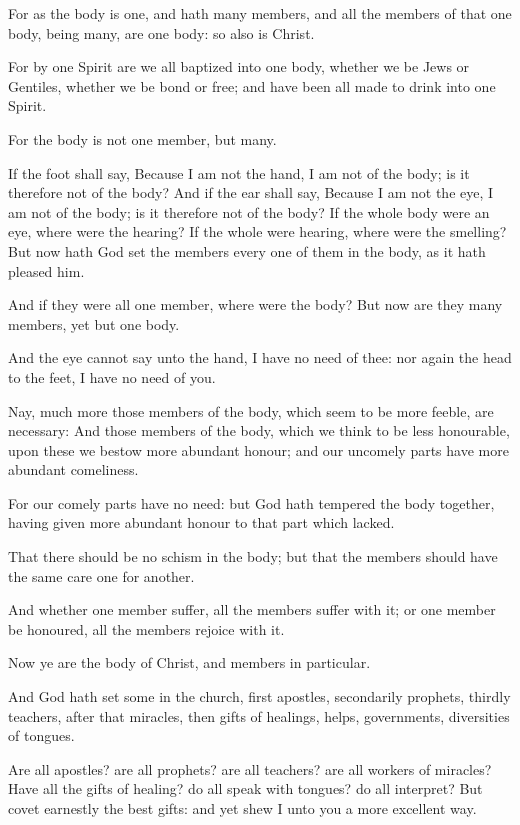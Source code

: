 \verse For as the body is one, and hath many members, and all the members of that one body, being many, are one body: so also is Christ.

\verse For by one Spirit are we all baptized into one body, whether we be Jews or Gentiles, whether we be bond or free; and have been all made to drink into one Spirit.

\verse For the body is not one member, but many.

\verse If the foot shall say, Because I am not the hand, I am not of the body; is it therefore not of the body?  \verse And if the ear shall say, Because I am not the eye, I am not of the body; is it therefore not of the body?  \verse If the whole body were an eye, where were the hearing? If the whole were hearing, where were the smelling?  \verse But now hath God set the members every one of them in the body, as it hath pleased him.

\verse And if they were all one member, where were the body?  \verse But now are they many members, yet but one body.

\verse And the eye cannot say unto the hand, I have no need of thee: nor again the head to the feet, I have no need of you.

\verse Nay, much more those members of the body, which seem to be more feeble, are necessary: \verse And those members of the body, which we think to be less honourable, upon these we bestow more abundant honour; and our uncomely parts have more abundant comeliness.

\verse For our comely parts have no need: but God hath tempered the body together, having given more abundant honour to that part which lacked.

\verse That there should be no schism in the body; but that the members should have the same care one for another.

\verse And whether one member suffer, all the members suffer with it; or one member be honoured, all the members rejoice with it.

\verse Now ye are the body of Christ, and members in particular.

\verse And God hath set some in the church, first apostles, secondarily prophets, thirdly teachers, after that miracles, then gifts of healings, helps, governments, diversities of tongues.

\verse Are all apostles? are all prophets? are all teachers? are all workers of miracles?  \verse Have all the gifts of healing? do all speak with tongues? do all interpret?  \verse But covet earnestly the best gifts: and yet shew I unto you a more excellent way.



